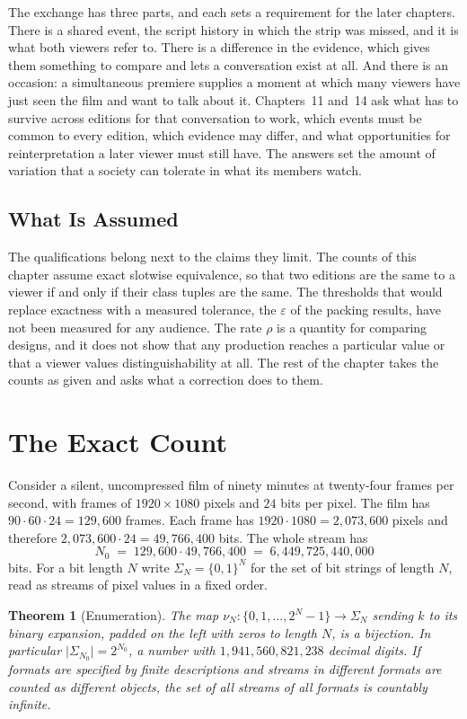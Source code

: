 \documentclass[11pt,twoside,openright]{book}
\theoremstyle{plain}
\newtheorem{theorem}{Theorem}[chapter]
\theoremstyle{definition}
\theoremstyle{remark}
\begin{document}
The exchange has three parts, and each sets a requirement for the later chapters. There is a shared event, the script history in which the strip was missed, and it is what both viewers refer to. There is a difference in the evidence, which gives them something to compare and lets a conversation exist at all. And there is an occasion: a simultaneous premiere supplies a moment at which many viewers have just seen the film and want to talk about it. Chapters~11 and~14 ask what has to survive across editions for that conversation to work, which events must be common to every edition, which evidence may differ, and what opportunities for reinterpretation a later viewer must still have. The answers set the amount of variation that a society can tolerate in what its members watch.

\subsection{What Is Assumed}

The qualifications belong next to the claims they limit. The counts of this chapter assume exact slotwise equivalence, so that two editions are the same to a viewer if and only if their class tuples are the same. The thresholds that would replace exactness with a measured tolerance, the $\varepsilon$ of the packing results, have not been measured for any audience. The rate $\rho$ is a quantity for comparing designs, and it does not show that any production reaches a particular value or that a viewer values distinguishability at all. The rest of the chapter takes the counts as given and asks what a correction does to them.

\section{The Exact Count}\label{sec:count}

Consider a silent, uncompressed film of ninety minutes at twenty-four frames per second, with frames of $1920\times1080$ pixels and $24$ bits per pixel. The film has $90\cdot60\cdot24=129{,}600$ frames. Each frame has $1920\cdot1080=2{,}073{,}600$ pixels and therefore $2{,}073{,}600\cdot24=49{,}766{,}400$ bits. The whole stream has
\[
N_0 \;=\; 129{,}600\cdot 49{,}766{,}400 \;=\; 6{,}449{,}725{,}440{,}000
\]
bits. For a bit length $N$ write $\Sigma_N=\{0,1\}^N$ for the set of bit strings of length $N$, read as streams of pixel values in a fixed order.

\begin{theorem}[Enumeration]\label{thm:enum}
The map $\nu_N:\{0,1,\dots,2^N-1\}\to\Sigma_N$ sending $k$ to its binary expansion, padded on the left with zeros to length $N$, is a bijection. In particular $\lvert\Sigma_{N_0}\rvert=2^{N_0}$, a number with $1{,}941{,}560{,}821{,}238$ decimal digits. If formats are specified by finite descriptions and streams in different formats are counted as different objects, the set of all streams of all formats is countably infinite.
\end{theorem}
\end{document}
